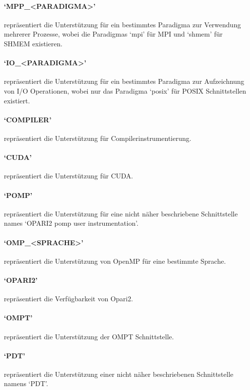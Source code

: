 \documentclass[german,proseminar,hyperref,utf8]{zihpub}
\begin{document}
    \paragraph{`MPP\_<PARADIGMA>'} repräsentiert die Unterstützung für ein bestimmtes Paradigma zur
    Verwendung mehrerer Prozesse, wobei die Paradigmas `mpi' für MPI und `shmem' für SHMEM existieren.

    \paragraph{`IO\_<PARADIGMA>'} repräsentiert die Unterstützung für ein bestimmtes Paradigma zur
    Aufzeichnung von I/O Operationen, wobei nur das Paradigma `posix' für POSIX Schnittstellen existiert.

    \paragraph{`COMPILER'} repräsentiert die Unterstützung für Compilerinstrumentierung.

    \paragraph{`CUDA'} repräsentiert die Unterstützung für CUDA.
    
    \paragraph{`POMP'} repräsentiert die Unterstützung für eine nicht näher beschriebene Schnittstelle
    names `OPARI2 pomp user instrumentation'.

    \paragraph{`OMP\_<SPRACHE>'} repräsentiert die Unterstützung von OpenMP für eine bestimmte Sprache.

    \paragraph{`OPARI2'} repräsentiert die Verfügbarkeit von Opari2.

    \paragraph{`OMPT'} repräsentiert die Unterstützung der OMPT Schnittstelle.

    \paragraph{`PDT'} repräsentiert die Unterstützung einer nicht näher beschriebenen Schnittstelle
    namens `PDT'.
\end{document}
